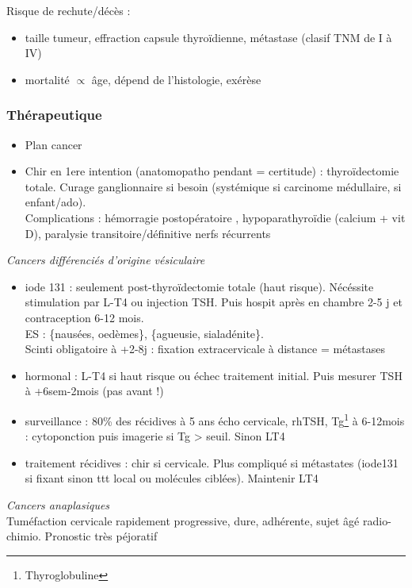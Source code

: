 \documentclass[11pt]{article}
\begin{document}
Risque de rechute/décès : 
\begin{itemize}
\item taille tumeur, effraction capsule thyroïdienne, métastase (clasif TNM de I à IV)
\item mortalité \(\propto\) âge, dépend de l'histologie, exérèse
\end{itemize}

\subsubsection{Thérapeutique}
\label{sec:orgdaeac49}
\begin{itemize}
\item Plan cancer
\item Chir en 1ere intention (anatomopatho pendant = certitude) : thyroïdectomie
totale. Curage ganglionnaire si besoin (systémique si carcinome médullaire,
si enfant/ado). \\
Complications : hémorragie postopératoire \skull,  hypoparathyroïdie (calcium + vit D), paralysie transitoire/définitive nerfs récurrents
\end{itemize}
\vspace*{10pt}

\emph{Cancers différenciés d'origine vésiculaire}
\begin{itemize}
\item iode 131 : seulement post-thyroïdectomie totale (haut risque). Nécéssite
stimulation par L-T4 ou injection TSH. Puis hospit après en chambre 2-5 j
et contraception 6-12 mois. \\
ES : \{nausées, oedèmes\}, \{agueusie, sialadénite\}. \\
Scinti  obligatoire à +2-8j : fixation extracervicale à  distance = métastases
\item hormonal : L-T4 si haut risque ou échec traitement initial. Puis mesurer TSH à
+6sem-2mois (pas avant !)
\item surveillance : 80\% des récidives à 5 ans \thus écho cervicale, rhTSH,
Tg\footnote{Thyroglobuline} à 6-12mois : cytoponction puis imagerie si Tg > seuil. Sinon \dec LT4
\item traitement récidives : chir si cervicale. Plus compliqué si métastates
(iode131 si fixant sinon ttt local ou molécules ciblées). Maintenir LT4
\end{itemize}

\emph{Cancers anaplasiques}\\
Tuméfaction cervicale rapidement progressive, dure, adhérente, sujet âgé \thus radio-chimio. Pronostic très péjoratif
\end{document}
